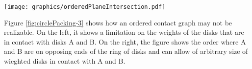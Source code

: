 \begin{minipage}{\linewidth}
\begin{center}
\texttt{[image: graphics/orderedPlaneIntersection.pdf]}
\end{center}
\label{fig:DiskArrangement-4}
\end{minipage}

Figure \ref{fig:circlePacking-3} shows how an ordered contact graph may not be realizable.  
On the left, it shows a limitation on the weights of the disks that are in contact with disks A and B. 
On the right, the figure shows the order where A and B are on opposing ends of the ring of disks and can allow of arbitrary size of wieghted disks in contact with A and B.
